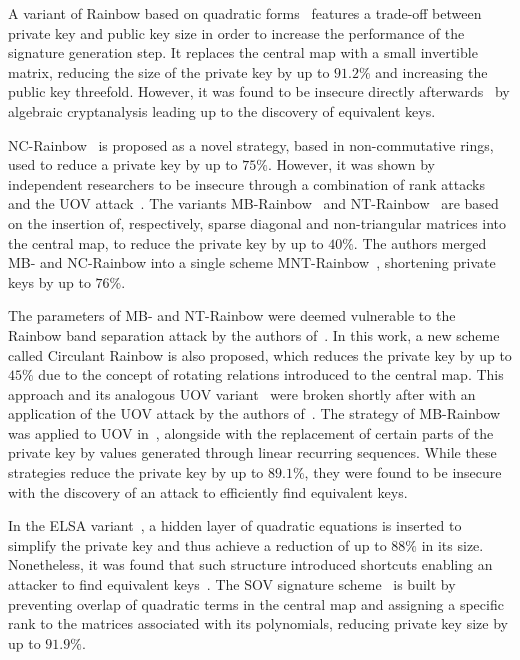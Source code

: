 \documentclass[draft, 12pt, a4paper, oneside]{memoir}
\theoremstyle{definition}
\theoremstyle{remark}
\begin{document}
A variant of Rainbow based on quadratic forms~\cite{Yasuda:201306} features a trade-off between private key and public key size in order to increase the performance of the signature generation step. It replaces the central map with a small invertible matrix, reducing the size of the private key by up to $91.2\%$ and increasing the public key threefold. However, it was found to be insecure directly afterwards~\cite{Hashimoto:201410} by algebraic cryptanalysis leading up to the discovery of equivalent keys.

NC-Rainbow~\cite{Yasuda:201202} is proposed as a novel strategy, based in non-commutative rings, used to reduce a private key by up to $75\%$. However, it was shown by independent researchers to be insecure through a combination of rank attacks and the UOV attack~\cite{Thomae:201209,Hashimoto:201302}. The variants MB-Rainbow~\cite{Yasuda:201305} and NT-Rainbow~\cite{Yasuda:201404} are based on the insertion of, respectively, sparse diagonal and non-triangular matrices into the central map, to reduce the private key by up to $40\%$. The authors merged MB- and NC-Rainbow into a single scheme MNT-Rainbow~\cite{Yasuda:201409}, shortening private keys by up to $76\%$. 

The parameters of MB- and NT-Rainbow were deemed vulnerable to the Rainbow band separation attack by the authors of~\cite{Peng:201706}. In this work, a new scheme called Circulant Rainbow is also proposed, which reduces the private key by up to $45\%$ due to the concept of rotating relations introduced to the central map. This approach and its analogous UOV variant~\cite{Peng:201803} were broken shortly after with an application of the UOV attack by the authors of~\cite{Hashimoto:201903}. The strategy of MB-Rainbow was applied to UOV in~\cite{Tan:201511}, alongside with the replacement of certain parts of the private key by values generated through linear recurring sequences. While these strategies reduce the private key by up to $89.1\%$, they were found to be insecure~\cite{Park:201803} with the discovery of an attack to efficiently find equivalent keys. 

In the ELSA variant~\cite{Shim:201712}, a hidden layer of quadratic equations is inserted to simplify the private key and thus achieve a reduction of up to $88\%$ in its size. Nonetheless, it was found that such structure introduced shortcuts enabling an attacker to find equivalent keys~\cite{Hashimoto:201909}. The SOV signature scheme~\cite{Shim:202001} is built by preventing overlap of quadratic terms in the central map and assigning a specific rank to the matrices associated with its polynomials, reducing private key size by up to $91.9\%$.
\end{document}
